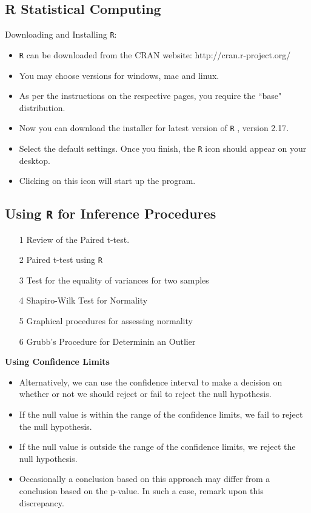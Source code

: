 \documentclass[]{report}
\begin{document}
		
		
		{
			\subsection{R Statistical Computing}
			Downloading and Installing \texttt{R}:
			
			\begin{itemize}
				\item \texttt{R} can be downloaded from the CRAN website: http://cran.r-project.org/
				\item You may choose versions for windows, mac and linux.
				\item As per the instructions on the respective pages, you require the ``base" distribution.
				\item Now you can download the installer for latest version of \texttt{R} , version 2.17.
				\item Select the default settings. Once you finish, the \texttt{R} icon should appear on your desktop.
				\item Clicking on this icon will start up the program.
			\end{itemize}
		}
		
\subsection{Using \texttt{R} for Inference Procedures}
		\begin{itemize}
			\item [1] Review of the Paired t-test.
			\item [2] Paired t-test using \texttt{R}
			\item [3] Test for the equality of variances for two samples
			\item [4] Shapiro-Wilk Test for Normality
			\item [5] Graphical procedures for assessing normality
			\item [6] Grubb's Procedure for Determinin an Outlier
		\end{itemize}
		
		

		
		
		\textbf{Using Confidence Limits}
		\begin{itemize}
			\item  Alternatively, we can use the confidence interval to make a decision on whether or not we should reject or fail to reject the null hypothesis.
			\item  If the null value is within the range of the confidence limits, we fail to reject the null hypothesis.
			\item  If the null value is outside the range of the confidence limits, we reject the null hypothesis.
			\item  Occasionally a conclusion based on this approach may differ from a conclusion based on the p-value. In such a case, remark upon this discrepancy.
		\end{itemize}
		
\end{document}
